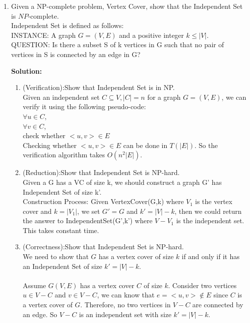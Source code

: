 \documentclass{article}%
\begin{document}
\begin{enumerate}

  \item Given a NP-complete problem, Vertex Cover, show that the Independent Set is $NP$-complete.\\
  Independent Set is defined as follows:\\
  INSTANCE: A graph $G=(V,E)$ and a positive integer $k \leq |V|$.\\
  QUESTION: Is there a subset S of k vertices in G such that no pair of vertices in S is connected by an edge in G?
  
\textbf{Solution:}
\begin{enumerate}
	\item (Verification):Show that Independent Set is in NP.
	\\ Given an independent set $C\subseteq V, |C|=n$ for a graph $G=(V,E)$, we can verify it using the following pseudo-code: \\
	
		$\forall u \in C$, \\
	\hspace*{0.2in}$\forall v \in C$, \\
	\hspace*{0.4in}check whether $<u,v> \in E$ \\

	Checking whether $<u,v> \in E$ can be done in $T(|E|)$. So the verification algorithm takes $O(n^{2}|E|)$.
	
%	
	
	\item (Reduction):Show that Independent Set is NP-hard.
	\\Given a G has a VC of size k, we should construct a graph G' has Independent Set of size k'.
	\\Construction Process: Given VertexCover(G,k) where $V_{1}$ is the vertex cover and $k=|V_{1}|$, we set $G'=G$ and $k'=|V|-k$, then we could return the answer to IndependentSet(G',k') where $V-V_{1}$ is the independent set. This takes constant time.\\
	
	\item (Correctness):Show that Independent Set is NP-hard.
	\\We need to show that $G$ has a vertex cover of size $k$ if and only if it has an Independent Set of size $k'=|V|-k$.\\
	\\Assume $G(V,E)$ has a vertex cover $C$ of size $k$. Consider two vertices $u\in V-C$ and $v\in V-C$, we can know that $e=<u,v>\notin E$ since $C$ is a vertex cover of $G$. Therefore, no two vertices in $V-C$ are connected by an edge. So $V-C$ is an independent set with size $k'=|V|-k$.\\	
		

\end{enumerate}
\end{enumerate}
\end{document}

